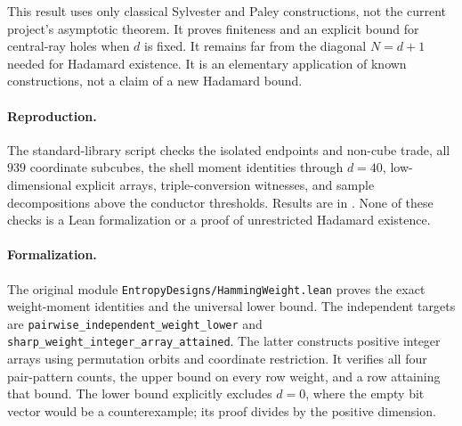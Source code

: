 This result uses only classical Sylvester and Paley constructions, not
the current project's asymptotic theorem. It proves finiteness and an
explicit bound for central-ray holes when $d$ is fixed. It remains far
from the diagonal $N=d+1$ needed for Hadamard existence. It is an
elementary application of known constructions, not a claim of a new
Hadamard bound.

\paragraph{Reproduction.}
The standard-library script  checks the isolated
endpoints and non-cube trade, all $939$ coordinate subcubes, the shell
moment identities through $d=40$, low-dimensional explicit arrays,
triple-conversion witnesses, and sample decompositions above the
conductor thresholds. Results are in .
None of these checks is a Lean formalization or a proof of unrestricted
Hadamard existence.

\paragraph{Formalization.}
The original module \texttt{EntropyDesigns/\allowbreak HammingWeight.lean}
proves the exact weight-moment identities and the universal lower bound.
The independent targets are
\texttt{pairwise\_\allowbreak independent\_\allowbreak weight\_\allowbreak lower}
and \texttt{sharp\_\allowbreak weight\_\allowbreak integer\_\allowbreak array\_\allowbreak attained}.
The latter constructs positive integer arrays using permutation orbits
and coordinate restriction. It verifies all four pair-pattern counts,
the upper bound on every row weight, and a row attaining that bound.
The lower bound explicitly excludes $d=0$, where the empty bit vector
would be a counterexample; its proof divides by the positive dimension.
